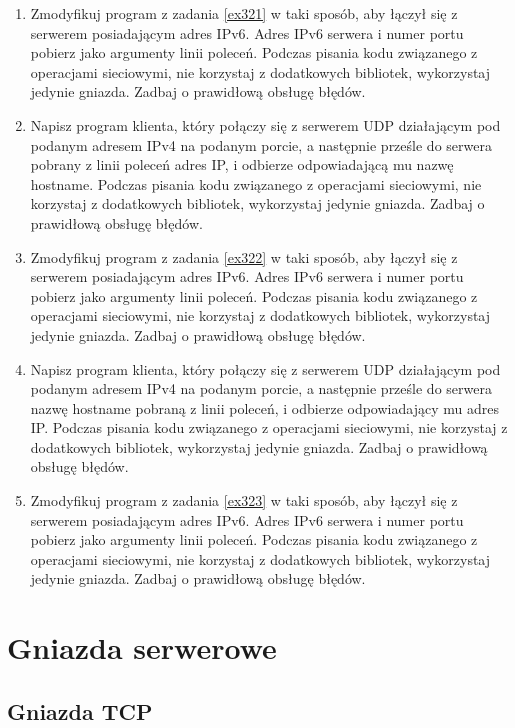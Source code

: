 \documentclass{article}
\begin{document}
\begin{enumerate}[label=\textbf{3.\arabic*}, resume]
\item  Zmodyfikuj program z zadania \ref{ex321} w taki sposób,  aby łączył się z serwerem posiadającym adres IPv6. Adres IPv6 serwera i numer portu pobierz jako argumenty linii poleceń. Podczas pisania kodu związanego z operacjami sieciowymi, nie korzystaj z dodatkowych bibliotek, wykorzystaj jedynie gniazda. Zadbaj o prawidłową obsługę błędów. 

\item \label{ex322} Napisz program klienta, który połączy się z serwerem UDP działającym pod podanym adresem IPv4 na podanym porcie, a następnie prześle do serwera pobrany z linii poleceń adres IP, i odbierze odpowiadającą mu nazwę hostname. Podczas pisania kodu związanego z operacjami sieciowymi, nie korzystaj z dodatkowych bibliotek, wykorzystaj jedynie gniazda. Zadbaj o prawidłową obsługę błędów. 

\item  Zmodyfikuj program z zadania \ref{ex322} w taki sposób,  aby łączył się z serwerem posiadającym adres IPv6. Adres IPv6 serwera i numer portu pobierz jako argumenty linii poleceń. Podczas pisania kodu związanego z operacjami sieciowymi, nie korzystaj z dodatkowych bibliotek, wykorzystaj jedynie gniazda. Zadbaj o prawidłową obsługę błędów. 

\item \label{ex323} Napisz program klienta, który połączy się z serwerem UDP działającym pod podanym adresem IPv4 na podanym porcie, a następnie prześle do serwera nazwę hostname pobraną z linii poleceń, i odbierze odpowiadający mu adres IP.  Podczas pisania kodu związanego z operacjami sieciowymi, nie korzystaj z dodatkowych bibliotek, wykorzystaj jedynie gniazda. Zadbaj o prawidłową obsługę błędów. 

\item Zmodyfikuj program z zadania \ref{ex323} w taki sposób,  aby łączył się z serwerem posiadającym adres IPv6. Adres IPv6 serwera i numer portu pobierz jako argumenty linii poleceń. Podczas pisania kodu związanego z operacjami sieciowymi, nie korzystaj z dodatkowych bibliotek, wykorzystaj jedynie gniazda. Zadbaj o prawidłową obsługę błędów. 
\end{enumerate}


\newpage
\section{Gniazda serwerowe}

\subsection*{Gniazda TCP}
\end{document}
